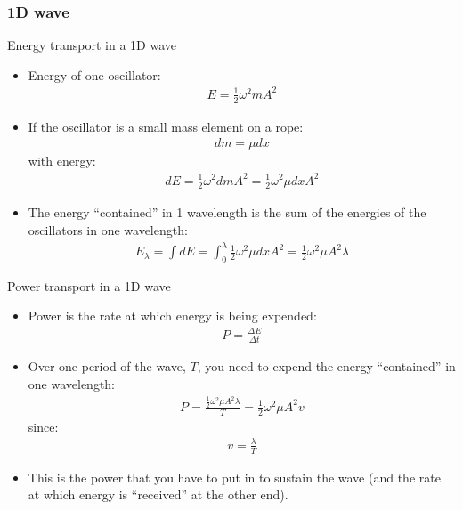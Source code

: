 \documentclass[aspectratio=169,
hyperref={colorlinks,urlcolor=blue}
]{beamer}
\begin{document}



\subsubsection{1D wave}
\label{subsubsec:1dwave}
\begin{frame}{Energy transport in a 1D wave}
\begin{itemize}
\item Energy of one oscillator:
\begin{align*}
E=\frac{1}{2}\omega^2 m A^2
\end{align*}
\item If the oscillator is a small mass element on a rope:
\begin{align*}
dm=\mu dx
\end{align*}
    with energy:     
\begin{align*}
dE=\frac{1}{2}\omega^2dmA^2=\frac{1}{2}\omega^2\mu dx A^2
\end{align*}
\item The energy ``contained'' in 1 wavelength is the sum of the energies of the oscillators in one wavelength:
\begin{align*}
E_\lambda=\int dE=\int_0^\lambda \frac{1}{2}\omega^2\mu dx A^2 = \frac{1}{2}\omega^2\mu A^2\lambda
\end{align*}
\end{itemize}

\end{frame}



\begin{frame}{Power transport in a 1D wave}
\begin{itemize}
\item Power is the rate at which energy is being expended:
\begin{align*}
P=\frac{\Delta E}{\Delta t}
\end{align*}
\item Over one period of the wave, $T$, you need to expend the energy ``contained'' in one wavelength:
\begin{align*}
P=\frac{\frac{1}{2}\omega^2\mu A^2\lambda}{T}=\frac{1}{2}\omega^2\mu A^2 v
\end{align*}
since:     
\begin{align*}
v=\frac{\lambda}{T}
\end{align*}
\item This is the power that you have to put in to sustain the wave (and the rate at which energy is ``received'' at the other end).
\end{itemize}

\end{frame}
\end{document}
